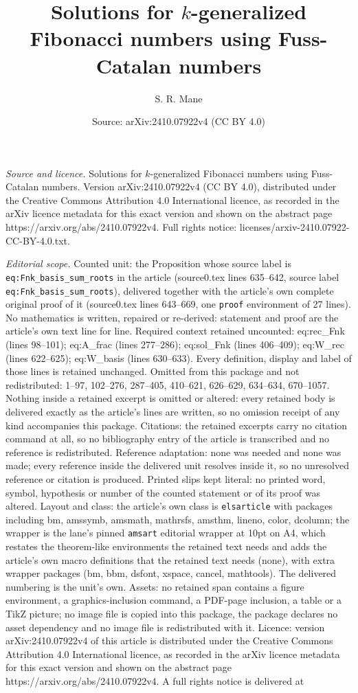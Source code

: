 \documentclass[10pt,a4paper]{amsart}
\title[Solutions for $k$-generalized Fibonacci numbers using Fuss-C]{Solutions for $k$-generalized Fibonacci numbers using Fuss-Catalan numbers}
\author{S. R. Mane}
\date{Source: arXiv:2410.07922v4 (CC BY 4.0)}
\begin{document}
\maketitle

\noindent\emph{Source and licence.} Solutions for $k$-generalized Fibonacci numbers using Fuss-Catalan numbers. Version arXiv:2410.07922v4 (CC BY 4.0), distributed under the Creative Commons Attribution 4.0 International licence, as recorded in the arXiv licence metadata for this exact version and shown on the abstract page https://arxiv.org/abs/2410.07922v4. Full rights notice: licenses/arxiv-2410.07922-CC-BY-4.0.txt.\par\smallskip

\noindent\textit{Editorial scope.} Counted unit: the Proposition whose source label is \texttt{eq:Fnk\_basis\_sum\_roots} in the article (source0.tex lines 635--642, source label \texttt{eq:Fnk\_basis\_sum\_roots}), delivered together with the article's own complete original proof of it (source0.tex lines 643--669, one \texttt{proof} environment of 27 lines). No mathematics is written, repaired or re-derived: statement and proof are the article's own text line for line. Required context retained uncounted: eq:rec\_Fnk (lines 98--101); eq:A\_frac (lines 277--286); eq:sol\_Fnk (lines 406--409); eq:W\_rec (lines 622--625); eq:W\_basis (lines 630--633). Every definition, display and label of those lines is retained unchanged. Omitted from this package and not redistributed: 1--97, 102--276, 287--405, 410--621, 626--629, 634--634, 670--1057. Nothing inside a retained excerpt is omitted or altered: every retained body is delivered exactly as the article's lines are written, so no omission receipt of any kind accompanies this package. Citations: the retained excerpts carry no citation command at all, so no bibliography entry of the article is transcribed and no reference is redistributed. Reference adaptation: none was needed and none was made; every reference inside the delivered unit resolves inside it, so no unresolved reference or citation is produced. Printed slips kept literal: no printed word, symbol, hypothesis or number of the counted statement or of its proof was altered. Layout and class: the article's own class is \texttt{elsarticle} with packages including bm, amssymb, amsmath, mathrsfs, amsthm, lineno, color, dcolumn; the wrapper is the lane's pinned \texttt{amsart} editorial wrapper at 10pt on A4, which restates the theorem-like environments the retained text needs and adds the article's own macro definitions that the retained text needs (none), with extra wrapper packages (bm, bbm, dsfont, xspace, cancel, mathtools). The delivered numbering is the unit's own. Assets: no retained span contains a figure environment, a graphics-inclusion command, a PDF-page inclusion, a table or a TikZ picture; no image file is copied into this package, the package declares no asset dependency and no image file is redistributed with it. Licence: version arXiv:2410.07922v4 of this article is distributed under the Creative Commons Attribution 4.0 International licence, as recorded in the arXiv licence metadata for this exact version and shown on the abstract page https://arxiv.org/abs/2410.07922v4. A full rights notice is delivered at 
\end{document}
